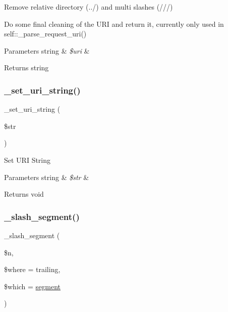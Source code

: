 Remove relative directory (../) and multi slashes (///)

Do some final cleaning of the U\+RI and return it, currently only used in self\+::\+\_\+parse\+\_\+request\+\_\+uri()


\begin{DoxyParams}[1]{Parameters}
string & {\em \$uri} & \\
\hline
\end{DoxyParams}
\begin{DoxyReturn}{Returns}
string 
\end{DoxyReturn}
\mbox{\label{class_c_i___u_r_i_a81a4c4d50fbac24b9ae091f9cfcaade3}} 
\subsubsection{\texorpdfstring{\+\_\+set\+\_\+uri\+\_\+string()}{\_set\_uri\_string()}}
{\footnotesize\ttfamily \+\_\+set\+\_\+uri\+\_\+string (\begin{DoxyParamCaption}\item[{}]{\$str }\end{DoxyParamCaption})\hspace{0.3cm}{\ttfamily [protected]}}

Set U\+RI String


\begin{DoxyParams}[1]{Parameters}
string & {\em \$str} & \\
\hline
\end{DoxyParams}
\begin{DoxyReturn}{Returns}
void 
\end{DoxyReturn}
\mbox{\label{class_c_i___u_r_i_a98974ace6ccf1b5e0923a7de9018095a}} 
\subsubsection{\texorpdfstring{\+\_\+slash\+\_\+segment()}{\_slash\_segment()}}
{\footnotesize\ttfamily \+\_\+slash\+\_\+segment (\begin{DoxyParamCaption}\item[{}]{\$n,  }\item[{}]{\$where = {\ttfamily \textquotesingle{}trailing\textquotesingle{}},  }\item[{}]{\$which = {\ttfamily \textquotesingle{}\mbox{\hyperlink{class_c_i___u_r_i_aeea297fbd38079886a2de35d633c1ed5}{segment}}\textquotesingle{}} }\end{DoxyParamCaption})\hspace{0.3cm}{\ttfamily [protected]}}


